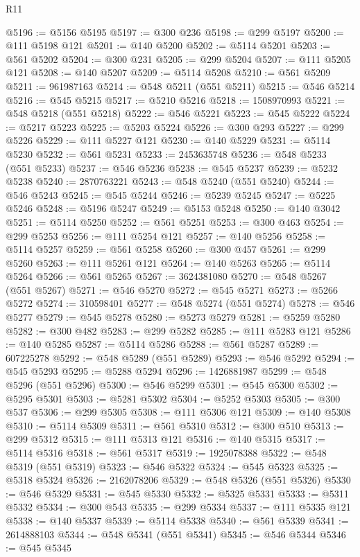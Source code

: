 \begin{lexlean}{R11}
\begin{coremodule}
{{{{{{{{{{{{{{{{{{{{{{{{{{{{{{{{{{{{{{{{{{{{{{{{{{{{{{{{{{{{{{{{{{{{{{{{{{{{{{{{{{@5196 := @5156 @5195
@5197 := @300 @236
@5198 := @299 @5197
@5200 := @111 @5198 @121
@5201 := @140 @5200
@5202 := @5114 @5201
@5203 := @561 @5202
@5204 := @300 @231
@5205 := @299 @5204
@5207 := @111 @5205 @121
@5208 := @140 @5207
@5209 := @5114 @5208
@5210 := @561 @5209
@5211 := 961987163
@5214 := @548 @5211 (@551 @5211)
@5215 := @546 @5214
@5216 := @545 @5215
@5217 := @5210 @5216
@5218 := 1508970993
@5221 := @548 @5218 (@551 @5218)
@5222 := @546 @5221
@5223 := @545 @5222
@5224 := @5217 @5223
@5225 := @5203 @5224
@5226 := @300 @293
@5227 := @299 @5226
@5229 := @111 @5227 @121
@5230 := @140 @5229
@5231 := @5114 @5230
@5232 := @561 @5231
@5233 := 2453635748
@5236 := @548 @5233 (@551 @5233)
@5237 := @546 @5236
@5238 := @545 @5237
@5239 := @5232 @5238
@5240 := 2870763221
@5243 := @548 @5240 (@551 @5240)
@5244 := @546 @5243
@5245 := @545 @5244
@5246 := @5239 @5245
@5247 := @5225 @5246
@5248 := @5196 @5247
@5249 := @5153 @5248
@5250 := @140 @3042
@5251 := @5114 @5250
@5252 := @561 @5251
@5253 := @300 @463
@5254 := @299 @5253
@5256 := @111 @5254 @121
@5257 := @140 @5256
@5258 := @5114 @5257
@5259 := @561 @5258
@5260 := @300 @457
@5261 := @299 @5260
@5263 := @111 @5261 @121
@5264 := @140 @5263
@5265 := @5114 @5264
@5266 := @561 @5265
@5267 := 3624381080
@5270 := @548 @5267 (@551 @5267)
@5271 := @546 @5270
@5272 := @545 @5271
@5273 := @5266 @5272
@5274 := 310598401
@5277 := @548 @5274 (@551 @5274)
@5278 := @546 @5277
@5279 := @545 @5278
@5280 := @5273 @5279
@5281 := @5259 @5280
@5282 := @300 @482
@5283 := @299 @5282
@5285 := @111 @5283 @121
@5286 := @140 @5285
@5287 := @5114 @5286
@5288 := @561 @5287
@5289 := 607225278
@5292 := @548 @5289 (@551 @5289)
@5293 := @546 @5292
@5294 := @545 @5293
@5295 := @5288 @5294
@5296 := 1426881987
@5299 := @548 @5296 (@551 @5296)
@5300 := @546 @5299
@5301 := @545 @5300
@5302 := @5295 @5301
@5303 := @5281 @5302
@5304 := @5252 @5303
@5305 := @300 @537
@5306 := @299 @5305
@5308 := @111 @5306 @121
@5309 := @140 @5308
@5310 := @5114 @5309
@5311 := @561 @5310
@5312 := @300 @510
@5313 := @299 @5312
@5315 := @111 @5313 @121
@5316 := @140 @5315
@5317 := @5114 @5316
@5318 := @561 @5317
@5319 := 1925078388
@5322 := @548 @5319 (@551 @5319)
@5323 := @546 @5322
@5324 := @545 @5323
@5325 := @5318 @5324
@5326 := 2162078206
@5329 := @548 @5326 (@551 @5326)
@5330 := @546 @5329
@5331 := @545 @5330
@5332 := @5325 @5331
@5333 := @5311 @5332
@5334 := @300 @543
@5335 := @299 @5334
@5337 := @111 @5335 @121
@5338 := @140 @5337
@5339 := @5114 @5338
@5340 := @561 @5339
@5341 := 2614888103
@5344 := @548 @5341 (@551 @5341)
@5345 := @546 @5344
@5346 := @545 @5345
}}}}}}}}}}}}}}}}}}}}}}}}}}}}}}}}}}}}}}}}}}}}}}}}}}}}}}}}}}}}}}}}}}}}}}}}}}}}}}}}}}
\end{coremodule}
\end{lexlean}
